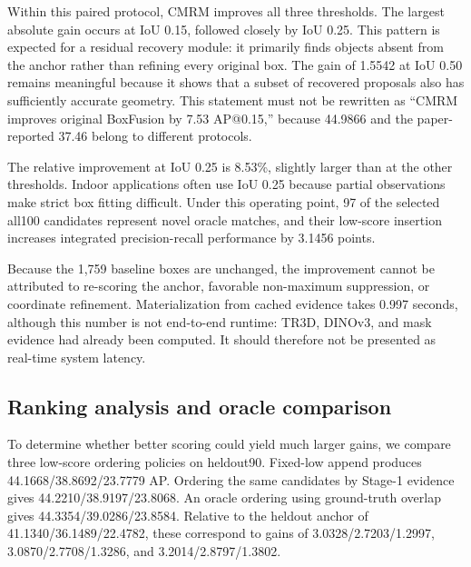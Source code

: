 \documentclass[11pt,a4paper]{article}
\begin{document}
\begin{table}[H]
\centering
\small
\caption{Paired ScanNet-100 detection results under the local frozen-anchor protocol.}
\label{tab:paired_results}
\end{table}
Within this paired protocol, CMRM improves all three thresholds. The largest absolute gain occurs at IoU 0.15, followed closely by IoU 0.25. This pattern is expected for a residual recovery module: it primarily finds objects absent from the anchor rather than refining every original box. The gain of 1.5542 at IoU 0.50 remains meaningful because it shows that a subset of recovered proposals also has sufficiently accurate geometry. This statement must not be rewritten as ``CMRM improves original BoxFusion by 7.53 AP@0.15,'' because 44.9866 and the paper-reported 37.46 belong to different protocols.

The relative improvement at IoU 0.25 is 8.53\%, slightly larger than at the other thresholds. Indoor applications often use IoU 0.25 because partial observations make strict box fitting difficult. Under this operating point, 97 of the selected all100 candidates represent novel oracle matches, and their low-score insertion increases integrated precision-recall performance by 3.1456 points.

Because the 1,759 baseline boxes are unchanged, the improvement cannot be attributed to re-scoring the anchor, favorable non-maximum suppression, or coordinate refinement. Materialization from cached evidence takes 0.997 seconds, although this number is not end-to-end runtime: TR3D, DINOv3, and mask evidence had already been computed. It should therefore not be presented as real-time system latency.

\subsection{Ranking analysis and oracle comparison}
To determine whether better scoring could yield much larger gains, we compare three low-score ordering policies on heldout90. Fixed-low append produces 44.1668/38.8692/23.7779 AP. Ordering the same candidates by Stage-1 evidence gives 44.2210/38.9197/23.8068. An oracle ordering using ground-truth overlap gives 44.3354/39.0286/23.8584. Relative to the heldout anchor of 41.1340/36.1489/22.4782, these correspond to gains of 3.0328/2.7203/1.2997, 3.0870/2.7708/1.3286, and 3.2014/2.8797/1.3802.
\end{document}
